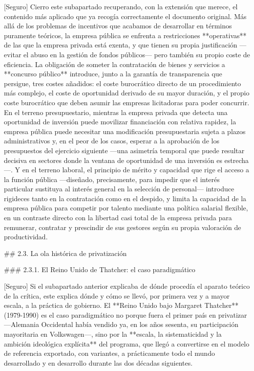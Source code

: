 \documentclass[10pt,a4paper]{article}
\begin{document}
[Seguro] Cierro este subapartado recuperando, con la extensión que merece, el contenido más aplicado que ya recogía correctamente el documento original. Más allá de los problemas de incentivos que acabamos de desarrollar en términos puramente teóricos, la empresa pública se enfrenta a restricciones **operativas** de las que la empresa privada está exenta, y que tienen su propia justificación —evitar el abuso en la gestión de fondos públicos— pero también su propio coste de eficiencia. La obligación de someter la contratación de bienes y servicios a **concurso público** introduce, junto a la garantía de transparencia que persigue, tres costes añadidos: el coste burocrático directo de un procedimiento más complejo, el coste de oportunidad derivado de su mayor duración, y el propio coste burocrático que deben asumir las empresas licitadoras para poder concurrir. En el terreno presupuestario, mientras la empresa privada que detecta una oportunidad de inversión puede movilizar financiación con relativa rapidez, la empresa pública puede necesitar una modificación presupuestaria sujeta a plazos administrativos y, en el peor de los casos, esperar a la aprobación de los presupuestos del ejercicio siguiente —una asimetría temporal que puede resultar decisiva en sectores donde la ventana de oportunidad de una inversión es estrecha—. Y en el terreno laboral, el principio de mérito y capacidad que rige el acceso a la función pública —diseñado, precisamente, para impedir que el interés particular sustituya al interés general en la selección de personal— introduce rigideces tanto en la contratación como en el despido, y limita la capacidad de la empresa pública para competir por talento mediante una política salarial flexible, en un contraste directo con la libertad casi total de la empresa privada para remunerar, contratar y prescindir de sus gestores según su propia valoración de productividad.

## 2.3. La ola histórica de privatización

### 2.3.1. El Reino Unido de Thatcher: el caso paradigmático

[Seguro] Si el subapartado anterior explicaba de dónde procedía el aparato teórico de la crítica, este explica dónde y cómo se llevó, por primera vez y a mayor escala, a la práctica de gobierno. El **Reino Unido bajo Margaret Thatcher** (1979-1990) es el caso paradigmático no porque fuera el primer país en privatizar —Alemania Occidental había vendido ya, en los años sesenta, su participación mayoritaria en Volkswagen—, sino por la **escala, la sistematicidad y la ambición ideológica explícita** del programa, que llegó a convertirse en el modelo de referencia exportado, con variantes, a prácticamente todo el mundo desarrollado y en desarrollo durante las dos décadas siguientes.
\end{document}
